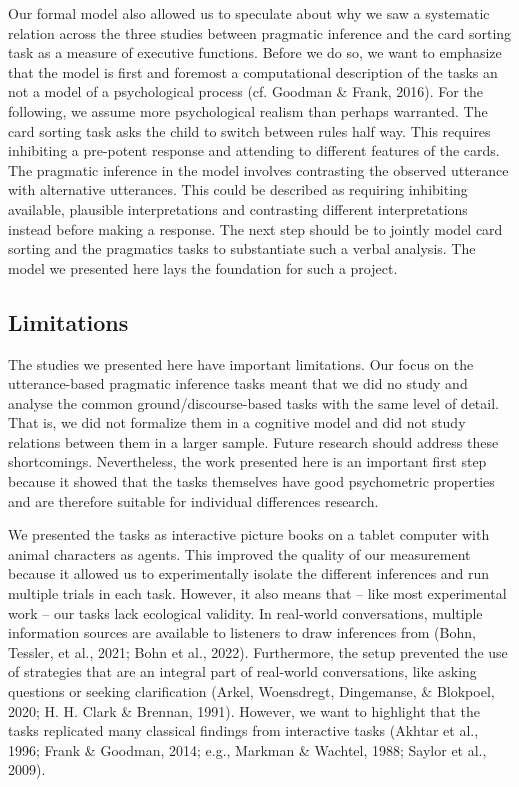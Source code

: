 \documentclass[
  man,floatsintext]{apa6}
\begin{document}
Our formal model also allowed us to speculate about why we saw a systematic relation across the three studies between pragmatic inference and the card sorting task as a measure of executive functions. Before we do so, we want to emphasize that the model is first and foremost a computational description of the tasks an not a model of a psychological process (cf. Goodman \& Frank, 2016). For the following, we assume more psychological realism than perhaps warranted. The card sorting task asks the child to switch between rules half way. This requires inhibiting a pre-potent response and attending to different features of the cards. The pragmatic inference in the model involves contrasting the observed utterance with alternative utterances. This could be described as requiring inhibiting available, plausible interpretations and contrasting different interpretations instead before making a response. The next step should be to jointly model card sorting and the pragmatics tasks to substantiate such a verbal analysis. The model we presented here lays the foundation for such a project.

\hypertarget{limitations}{%
\subsection{Limitations}\label{limitations}}

The studies we presented here have important limitations. Our focus on the utterance-based pragmatic inference tasks meant that we did no study and analyse the common ground/discourse-based tasks with the same level of detail. That is, we did not formalize them in a cognitive model and did not study relations between them in a larger sample. Future research should address these shortcomings. Nevertheless, the work presented here is an important first step because it showed that the tasks themselves have good psychometric properties and are therefore suitable for individual differences research.

We presented the tasks as interactive picture books on a tablet computer with animal characters as agents. This improved the quality of our measurement because it allowed us to experimentally isolate the different inferences and run multiple trials in each task. However, it also means that -- like most experimental work -- our tasks lack ecological validity. In real-world conversations, multiple information sources are available to listeners to draw inferences from (Bohn, Tessler, et al., 2021; Bohn et al., 2022). Furthermore, the setup prevented the use of strategies that are an integral part of real-world conversations, like asking questions or seeking clarification (Arkel, Woensdregt, Dingemanse, \& Blokpoel, 2020; H. H. Clark \& Brennan, 1991). However, we want to highlight that the tasks replicated many classical findings from interactive tasks (Akhtar et al., 1996; Frank \& Goodman, 2014; e.g., Markman \& Wachtel, 1988; Saylor et al., 2009).
\end{document}
